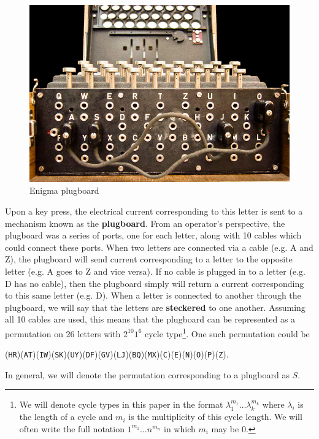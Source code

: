 \begin{figure}[htbp]
  \begin{center}\includegraphics[scale=1.2]{paper/images/plugboard.jpg}
  \end{center}
  \label{ref:plugboard}
  \caption{Enigma plugboard}
\end{figure}
\noindent Upon a key press, the electrical current corresponding to this letter
is sent to a mechanism known as the {\bf{plugboard}}. From an operator's
perspective, the plugboard was a series of ports, one for each
letter, along with 10 cables which could connect these ports. When
two letters are connected via a cable (e.g. A and Z), the plugboard
will send current corresponding to a letter to the opposite letter
(e.g. A goes to Z and vice versa). If no cable is plugged in to a
letter (e.g. D has no cable), then the plugboard simply will return a
current corresponding to this same letter (e.g. D). When a letter is connected to another 
through the plugboard, we will say that the letters are {\bf{steckered}} to one another. Assuming all 10
cables are used, this means that the plugboard can be represented as a
permutation on 26 letters with $2^{10}1^6$ cycle type\footnote{We
  will denote cycle types in this paper in the format
  $\lambda_1^{m_1}\dots\lambda_k^{m_k}$ where $\lambda_i$ is the length
of a cycle and $m_i$ is the multiplicity of this cycle length. We will often write the full notation $1^{m_1}\dots n^{m_n}$ in which $m_i$ may be $0$.}. One such
permutation could be
\begin{center}
  (\texttt{HR})(\texttt{AT})(\texttt{IW})(\texttt{SK})(\texttt{UY})(\texttt{DF})(\texttt{GV})(\texttt{LJ})(\texttt{BQ})(\texttt{MX})(\texttt{C})(\texttt{E})(\texttt{N})(\texttt{O})(\texttt{P})(\texttt{Z}).
\end{center}
In general, we will denote the permutation corresponding to a plugboard as $S$.

